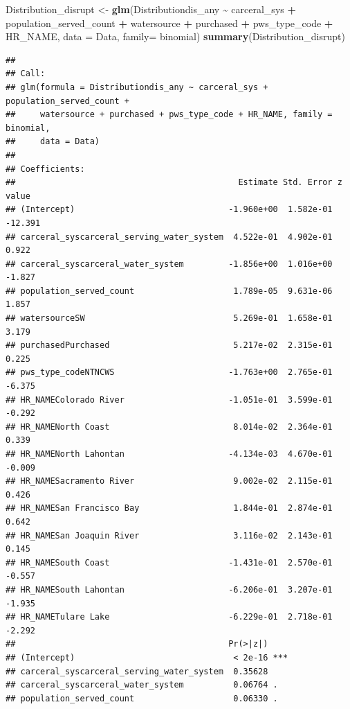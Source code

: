 \documentclass[
]{article}
\newenvironment{Shaded}{\begin{snugshade}}{\end{snugshade}}
\newcommand{\AttributeTok}[1]{\textcolor[rgb]{0.13,0.29,0.53}{#1}}
\newcommand{\FunctionTok}[1]{\textcolor[rgb]{0.13,0.29,0.53}{\textbf{#1}}}
\newcommand{\NormalTok}[1]{#1}
\newcommand{\OtherTok}[1]{\textcolor[rgb]{0.56,0.35,0.01}{#1}}
\newcommand{\SpecialCharTok}[1]{\textcolor[rgb]{0.81,0.36,0.00}{\textbf{#1}}}
\begin{document}
\begin{Shaded}
\begin{Highlighting}[]
\NormalTok{Distribution\_disrupt }\OtherTok{\textless{}{-}} \FunctionTok{glm}\NormalTok{(Distributiondis\_any }\SpecialCharTok{\textasciitilde{}}\NormalTok{ carceral\_sys }\SpecialCharTok{+}\NormalTok{ population\_served\_count }\SpecialCharTok{+}\NormalTok{ watersource }\SpecialCharTok{+}\NormalTok{ purchased }\SpecialCharTok{+}\NormalTok{ pws\_type\_code }\SpecialCharTok{+}\NormalTok{ HR\_NAME, }\AttributeTok{data =}\NormalTok{ Data, }\AttributeTok{family=}\NormalTok{ binomial)}
\FunctionTok{summary}\NormalTok{(Distribution\_disrupt)}
\end{Highlighting}
\end{Shaded}

\begin{verbatim}
## 
## Call:
## glm(formula = Distributiondis_any ~ carceral_sys + population_served_count + 
##     watersource + purchased + pws_type_code + HR_NAME, family = binomial, 
##     data = Data)
## 
## Coefficients:
##                                             Estimate Std. Error z value
## (Intercept)                               -1.960e+00  1.582e-01 -12.391
## carceral_syscarceral_serving_water_system  4.522e-01  4.902e-01   0.922
## carceral_syscarceral_water_system         -1.856e+00  1.016e+00  -1.827
## population_served_count                    1.789e-05  9.631e-06   1.857
## watersourceSW                              5.269e-01  1.658e-01   3.179
## purchasedPurchased                         5.217e-02  2.315e-01   0.225
## pws_type_codeNTNCWS                       -1.763e+00  2.765e-01  -6.375
## HR_NAMEColorado River                     -1.051e-01  3.599e-01  -0.292
## HR_NAMENorth Coast                         8.014e-02  2.364e-01   0.339
## HR_NAMENorth Lahontan                     -4.134e-03  4.670e-01  -0.009
## HR_NAMESacramento River                    9.002e-02  2.115e-01   0.426
## HR_NAMESan Francisco Bay                   1.844e-01  2.874e-01   0.642
## HR_NAMESan Joaquin River                   3.116e-02  2.143e-01   0.145
## HR_NAMESouth Coast                        -1.431e-01  2.570e-01  -0.557
## HR_NAMESouth Lahontan                     -6.206e-01  3.207e-01  -1.935
## HR_NAMETulare Lake                        -6.229e-01  2.718e-01  -2.292
##                                           Pr(>|z|)    
## (Intercept)                                < 2e-16 ***
## carceral_syscarceral_serving_water_system  0.35628    
## carceral_syscarceral_water_system          0.06764 .  
## population_served_count                    0.06330 .  

\end{verbatim}
\end{document}
